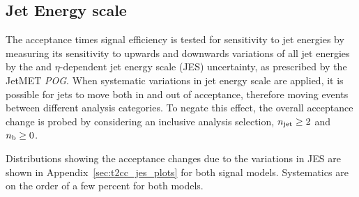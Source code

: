 





\subsection{Jet Energy scale}

The acceptance times signal efficiency is tested for sensitivity to jet energies by measuring
its sensitivity to upwards and downwards variations of all jet energies by the 
\Pt and $\eta\text{-dependent}$ jet energy scale (JES) uncertainty, as prescribed by 
the JetMET \emph{POG}. When systematic variations in jet
energy scale are applied, it is possible for jets to move both in and out of
acceptance, therefore moving events between different analysis categories.
To negate this effect, the overall acceptance change is probed by
considering an inclusive analysis selection, $n_{\text{jet}} \geq 2$ and $n_{\text{b}} \geq 0$. 

Distributions showing the acceptance changes due to the variations in JES are 
shown in Appendix~\ref{sec:t2cc_jes_plots} for both signal models. Systematics
are on the order of a few percent for both models.


